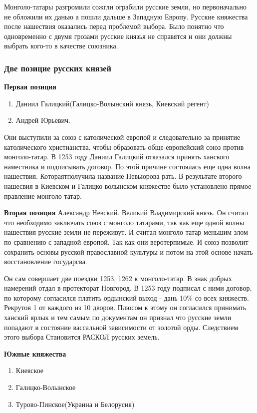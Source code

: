 \documentclass[a4paper]{article}
\begin{document}
Монголо-татары разгромили сожгли ограбили русские земли, но первоначально не обложили их данью а пошли дальше в Западную Европу. Русские княжества после нашествия оказались перед проблемой выбора. Было понятно что одновременно с двумя грозами русские князья не справятся и они должны выбрать кого-то в качестве союзника.

\subsubsection{Две позицие русских князей}


\textbf{Первая позиция}
\begin{enumerate}
    \item Даниил Галицкий(Галицко-Волынский князь, Киевский регент)
    \item Андрей Юрьевич.
\end{enumerate}
Они выступили за союз с католической европой и следовательно за принятие католического христианства, чтобы образовать обще-европейский союз против монголо-татар. В 1253 году Даниил Галицкий отказался принять ханского наместника и подписывать договор. По этой причине состоялась еще одна волна нашествия. Котораятполучила название Невьюрова рать.
В результате второго нашесвия в Киевском и Галицко волынском княжестве было установлено прямое правление монголо-татар.


\textbf{Вторая позиция}
Александр Невский. Великий Владимирский князь. Он считал что необходимо заключать союз с монголо татарами, так как еще одной волны нашествия русские земли не переживут. И считал монголо татар меньшим злом по сравнению с западной европой. Так как они веротерпимые. И союз позволит сохранить основы русской православной культуры и потом на этой основе начать восстановление государсва. 

Он сам совершает две поездки 1253, 1262 к монголо-татар. В знак добрых намерений отдал в протекторат Новгород.
В 1253 году подписал с ними договор, по которому согласился платить ордынский выход - дань 10\% со всех княжеств. Рекрутов 1 от каждого из 10 дворов. Плюсом к этому он согласился принимать ханский ярлык и тем самым по документам он признал что русские земли попадают в состояние вассальной зависимости от золотой орды. Следствием этого выбора Становится РАСКОЛ русских земель.

\textbf{Южные княжества}
\begin{enumerate}
    \item Киевское
    \item Галицко-Волынское
    \item Турово-Пинское(Украина и Белорусия)
\end{enumerate}
\end{document}
